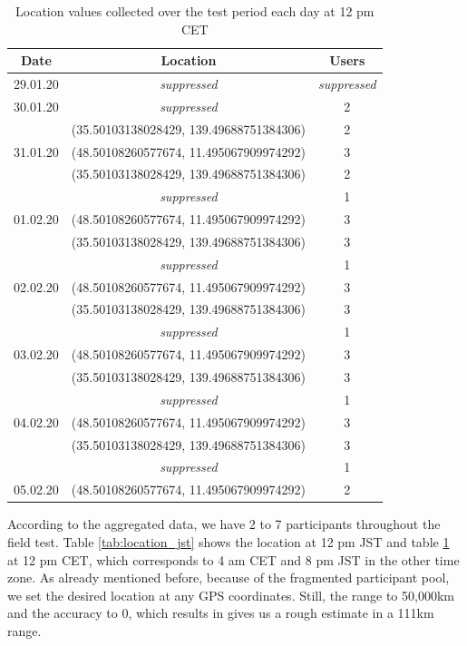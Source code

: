 \begin{table}[htbp]
	\centering
	\begin{tabular}{|c c c|} 
		\hline
		Date & Location & Users\\ [0.5ex] 
		\hline\hline
		29.01.20 &\textit{suppressed}&\textit{suppressed}\\ 
		\hline
		30.01.20 &\textit{suppressed}& 2 \\ 
		& (35.50103138028429, 139.49688751384306) & 2 \\
		\hline
		31.01.20 & (48.50108260577674, 11.495067909974292) & 3 \\ 
		& (35.50103138028429, 139.49688751384306) & 2 \\
		&\textit{suppressed}& 1 \\
		\hline
		01.02.20 & (48.50108260577674, 11.495067909974292) & 3 \\ 
		& (35.50103138028429, 139.49688751384306) & 3 \\
		&\textit{suppressed}& 1 \\
		\hline
		02.02.20 & (48.50108260577674, 11.495067909974292) & 3 \\ 
		& (35.50103138028429, 139.49688751384306) & 3 \\
		&\textit{suppressed}& 1 \\
		\hline
		03.02.20 & (48.50108260577674, 11.495067909974292) & 3 \\ 
		& (35.50103138028429, 139.49688751384306) & 3 \\
		&\textit{suppressed}& 1 \\
		\hline
		04.02.20 & (48.50108260577674, 11.495067909974292) & 3 \\ 
		& (35.50103138028429, 139.49688751384306) & 3 \\
		&\textit{suppressed}& 1 \\
		\hline
		05.02.20 & (48.50108260577674, 11.495067909974292) & 2 \\ 
		\hline
	\end{tabular}
	\caption{Location values collected over the test period each day at 12 pm CET}
	\label{tab:location_cet}
\end{table}

According to the aggregated data, we have 2 to 7 participants throughout the field test. Table \ref{tab:location_jst} shows the location at 12 pm JST and table \ref{tab:location_cet} at 12 pm CET, which corresponds to 4 am CET and 8 pm JST in the other time zone. As already mentioned before, because of the fragmented participant pool, we set the desired location at any GPS coordinates. Still, the range to 50,000km and the accuracy to 0, which results in gives us a rough estimate in a 111km range.

